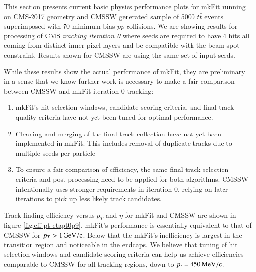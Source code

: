 \documentclass{webofc}
\def\mkfit{mkFit\xspace}
\def\MeVoc{\ensuremath{\,\rm{M}e\rm{V}/c}}
\def\GeVoc{\ensuremath{\,\rm{G}e\rm{V}/c}}
\begin{document}
This section presents current basic physics performance plots for \mkfit
running on CMS-2017 geometry and CMSSW generated sample of 5000 $t\bar{t}$
events superimposed with 70 minimum-bias $pp$ collisions. We are showing
results for processing of CMS \emph{tracking iteration 0} where seeds are
required to have 4 hits all coming from distinct inner pixel layers and be
compatible with the beam spot constraint. Results shown for CMSSW are using
the same set of input seeds.

While these results show the actual performance of \mkfit, they are
preliminary in a sense that we know further work is necessary to make a fair
comparison between CMSSW and \mkfit iteration 0 tracking:
\begin{enumerate}[--]\topsep-2pt\itemsep-2pt
\item \mkfit's hit selection windows, candidate scoring criteria, and final track
  quality criteria have not yet been tuned for optimal performance.
\item Cleaning and merging of the final track collection have not yet been
  implemented in \mkfit. This includes removal of duplicate tracks due to
  multiple seeds per particle.
\item To ensure a fair comparison of efficiency, the same final track selection
  criteria and post-processing need to be applied for both algorithms. CMSSW
  intentionally uses stronger requirements in iteration 0, relying on later
  iterations to pick up less likely track candidates.
\end{enumerate}

Track finding efficiency versus $p_T$ and $\eta$ for \mkfit and CMSSW are shown
in figure \ref{fig:eff-pt-etapt0p9}. \mkfit's performance is essentially
equivalent to that of CMSSW for $p_T > 1\GeVoc$. Below that the \mkfit's
inefficiency is largest in the transition region and noticeable in the
endcaps. We believe that tuning of hit selection windows and candidate scoring
criteria can help us achieve efficiencies comparable to CMSSW for all tracking
regions, down to $p_t = 450\MeVoc$.
\end{document}
